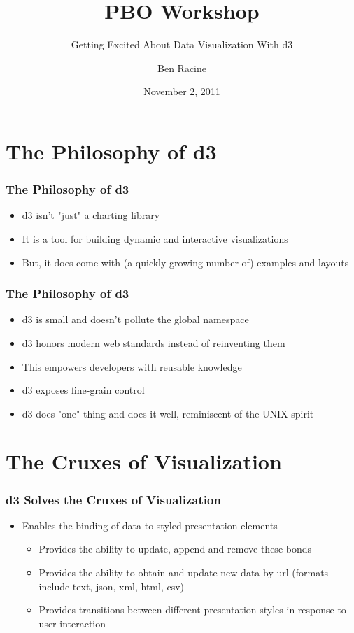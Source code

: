 \documentclass{beamer}
\title{PBO Workshop}
\subtitle{Getting Excited About Data Visualization With d3}
\author{Ben Racine \inst{1} }
\institute{\inst{1} Cornerstone Systems NW }
\date{November 2, 2011}
\begin{document}
\begin{frame}
    \frametitle{}
    \titlepage
\end{frame}



\section{The Philosophy of d3}



\begin{frame}
\frametitle{The Philosophy of d3}
\begin{itemize}
\pause
\item d3 isn't "just" a charting library
\pause
\item It is a tool for building dynamic and interactive visualizations
\pause
\item But, it does come with (a quickly growing number of) examples and layouts
\end{itemize}
\end{frame}



\begin{frame}
\frametitle{The Philosophy of d3}
\begin{itemize}
\pause
\item d3 is small and doesn't pollute the global namespace
\pause
\item d3 honors modern web standards instead of reinventing them
\pause
\item This empowers developers with reusable knowledge
\pause
\item d3 exposes fine-grain control
\pause
\item d3 does "one" thing and does it well, reminiscent of the UNIX spirit
\end{itemize}
\end{frame}




\section{The Cruxes of Visualization}


\begin{frame}
\frametitle{d3 Solves the Cruxes of Visualization}
\begin{itemize}
\pause
\item Enables the binding of data to styled presentation elements 
    \begin{itemize}
\pause
    \item Provides the ability to update, append and remove these bonds 
\pause
    \item Provides the ability to obtain and update new data by url (formats include text, json, xml, html, csv)
\pause
    \item Provides transitions between different presentation styles in response to user interaction
    \end{itemize}
\end{itemize}
\end{frame}
\end{document}
